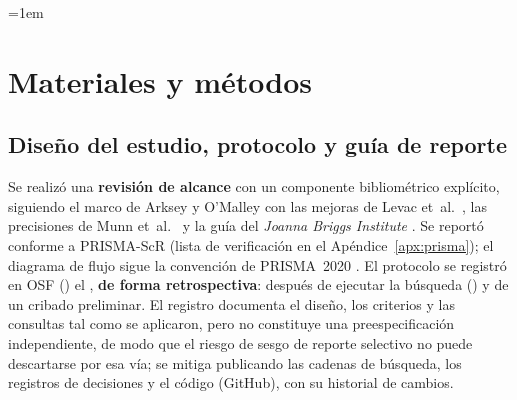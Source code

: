\emergencystretch=1em

\section{Materiales y métodos}
\label{sec:metodos}

\subsection{Diseño del estudio, protocolo y guía de reporte}
\label{sub:diseno}

Se realizó una \textbf{revisión de alcance} con un componente bibliométrico
explícito, siguiendo el marco de Arksey y O'Malley
\parencite{arksey2005scoping} con las mejoras de Levac et~al.\
\parencite{levac2010scoping}, las precisiones de Munn et~al.\
\parencite{munn2018scoping} y la guía del \textit{Joanna Briggs Institute}
\parencite{peters2020scoping}. Se reportó conforme a PRISMA-ScR
\parencite{tricco2018prismascr} (lista de verificación en el
Apéndice~\ref{apx:prisma}); el diagrama de flujo sigue la convención de
PRISMA~2020 \parencite{page2021prisma}. El protocolo se registró en OSF
(\OSFTexto) el \FechaRegistroOSF, \textbf{de forma retrospectiva}: después de
ejecutar la búsqueda (\FechaBusqueda) y de un cribado preliminar. El
registro documenta el diseño, los criterios y las consultas tal como se
aplicaron, pero no constituye una preespecificación independiente, de
modo que el riesgo de sesgo de reporte selectivo no puede descartarse por
esa vía; se mitiga publicando las cadenas de búsqueda, los registros de
decisiones y el código (GitHub), con su historial de cambios.

